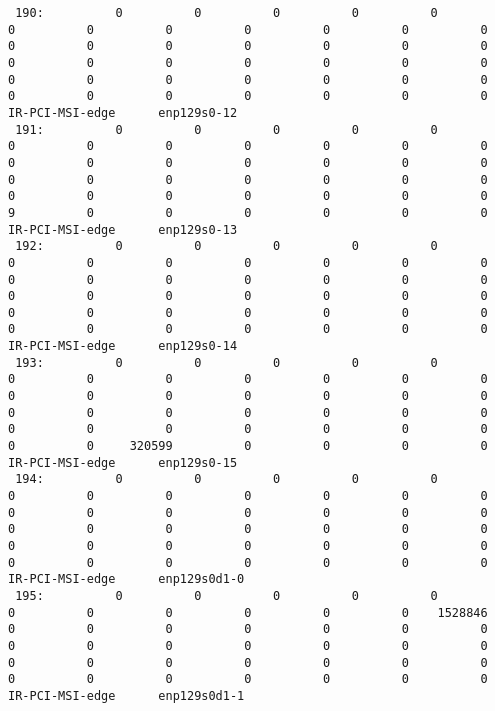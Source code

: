 \begin{lstlisting}
 190:          0          0          0          0          0          0          0          0          0          0          0          0          0          0          0          0          0          0          0          0          0          0          0          0          0          0          0          0          0          0          0          0          0          0          0          0          0          0          0          0  IR-PCI-MSI-edge      enp129s0-12
 191:          0          0          0          0          0          0          0          0          0          0          0          0          0          0          0          0          0          0          0          0          0          0          0          0          0          0          0          0          0          0          0          0          0          9          0          0          0          0          0          0  IR-PCI-MSI-edge      enp129s0-13
 192:          0          0          0          0          0          0          0          0          0          0          0          0          0          0          0          0          0          0          0          0          0          0          0          0          0          0          0          0          0          0          0          0          0          0          0          0          0          0          0          0  IR-PCI-MSI-edge      enp129s0-14
 193:          0          0          0          0          0          0          0          0          0          0          0          0          0          0          0          0          0          0          0          0          0          0          0          0          0          0          0          0          0          0          0          0          0          0          0     320599          0          0          0          0  IR-PCI-MSI-edge      enp129s0-15
 194:          0          0          0          0          0          0          0          0          0          0          0          0          0          0          0          0          0          0          0          0          0          0          0          0          0          0          0          0          0          0          0          0          0          0          0          0          0          0          0          0  IR-PCI-MSI-edge      enp129s0d1-0
 195:          0          0          0          0          0          0          0          0          0          0          0    1528846          0          0          0          0          0          0          0          0          0          0          0          0          0          0          0          0          0          0          0          0          0          0          0          0          0          0          0          0  IR-PCI-MSI-edge      enp129s0d1-1


\end{lstlisting}
